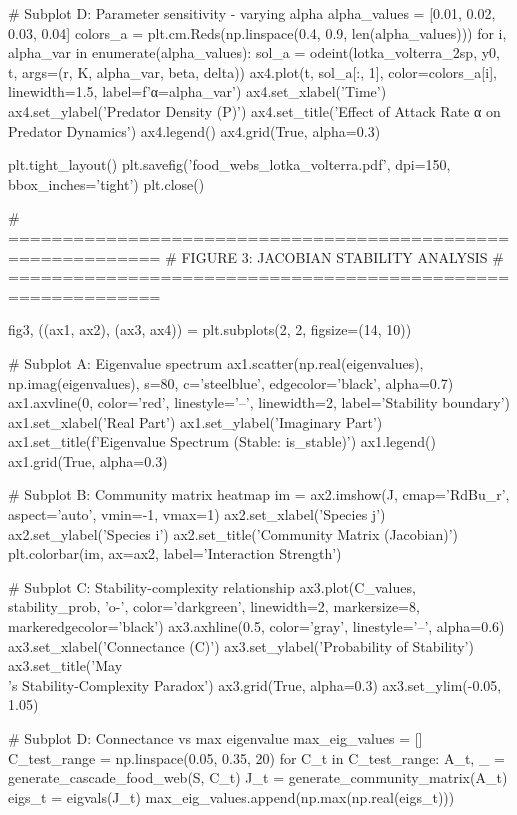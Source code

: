 \documentclass[a4paper, 11pt]{article}
\begin{document}
\begin{pycode}
# Subplot D: Parameter sensitivity - varying alpha
alpha_values = [0.01, 0.02, 0.03, 0.04]
colors_a = plt.cm.Reds(np.linspace(0.4, 0.9, len(alpha_values)))
for i, alpha_var in enumerate(alpha_values):
    sol_a = odeint(lotka_volterra_2sp, y0, t, args=(r, K, alpha_var, beta, delta))
    ax4.plot(t, sol_a[:, 1], color=colors_a[i], linewidth=1.5, label=f'α={alpha_var}')
ax4.set_xlabel('Time')
ax4.set_ylabel('Predator Density (P)')
ax4.set_title('Effect of Attack Rate α on Predator Dynamics')
ax4.legend()
ax4.grid(True, alpha=0.3)

plt.tight_layout()
plt.savefig('food_webs_lotka_volterra.pdf', dpi=150, bbox_inches='tight')
plt.close()

# ============================================================
# FIGURE 3: JACOBIAN STABILITY ANALYSIS
# ============================================================

fig3, ((ax1, ax2), (ax3, ax4)) = plt.subplots(2, 2, figsize=(14, 10))

# Subplot A: Eigenvalue spectrum
ax1.scatter(np.real(eigenvalues), np.imag(eigenvalues), s=80,
            c='steelblue', edgecolor='black', alpha=0.7)
ax1.axvline(0, color='red', linestyle='--', linewidth=2, label='Stability boundary')
ax1.set_xlabel('Real Part')
ax1.set_ylabel('Imaginary Part')
ax1.set_title(f'Eigenvalue Spectrum (Stable: {is_stable})')
ax1.legend()
ax1.grid(True, alpha=0.3)

# Subplot B: Community matrix heatmap
im = ax2.imshow(J, cmap='RdBu_r', aspect='auto', vmin=-1, vmax=1)
ax2.set_xlabel('Species j')
ax2.set_ylabel('Species i')
ax2.set_title('Community Matrix (Jacobian)')
plt.colorbar(im, ax=ax2, label='Interaction Strength')

# Subplot C: Stability-complexity relationship
ax3.plot(C_values, stability_prob, 'o-', color='darkgreen',
         linewidth=2, markersize=8, markeredgecolor='black')
ax3.axhline(0.5, color='gray', linestyle='--', alpha=0.6)
ax3.set_xlabel('Connectance (C)')
ax3.set_ylabel('Probability of Stability')
ax3.set_title('May\\'s Stability-Complexity Paradox')
ax3.grid(True, alpha=0.3)
ax3.set_ylim(-0.05, 1.05)

# Subplot D: Connectance vs max eigenvalue
max_eig_values = []
C_test_range = np.linspace(0.05, 0.35, 20)
for C_t in C_test_range:
    A_t, _ = generate_cascade_food_web(S, C_t)
    J_t = generate_community_matrix(A_t)
    eigs_t = eigvals(J_t)
    max_eig_values.append(np.max(np.real(eigs_t)))


\end{pycode}
\end{document}

